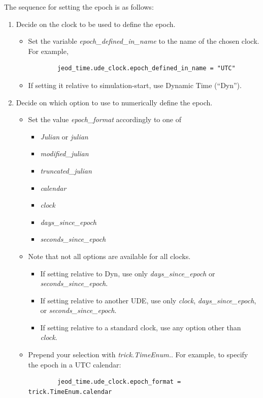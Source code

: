 The sequence for setting the epoch is as follows:
\begin{enumerate}
 \item Decide on the clock to be used to define the epoch.
 \begin{itemize}
  \item Set the variable \textit{epoch\_defined\_in\_name} to the name of the
  chosen clock.  For example,
  \begin{verbatim}
        jeod_time.ude_clock.epoch_defined_in_name = "UTC"
  \end{verbatim}
  \item If setting it relative to simulation-start, use Dynamic Time
  (``Dyn'').
 \end{itemize}

 \item Decide on which option to use to numerically define the epoch.
 \begin{itemize}
  \item Set the value \textit{epoch\_format} accordingly to one of
  \begin{itemize}
   \item \textit{Julian} or \textit{julian}
   \item \textit{modified\_julian}
   \item \textit{truncated\_julian}
   \item \textit{calendar}
   \item \textit{clock}
   \item \textit{days\_since\_epoch}
   \item \textit{seconds\_since\_epoch}
  \end{itemize}
  \item  Note that not all options are available for all clocks.
  \begin{itemize}
   \item If setting relative to Dyn, use only \textit{days\_since\_epoch}
   or \textit{seconds\_since\_epoch}.
   \item If setting relative to another UDE, use only \textit{clock},
   \textit{days\_since\_epoch},
   or \textit{seconds\_since\_epoch}.
   \item If setting relative to a standard clock, use any option other than
   \textit{clock}.
  \end{itemize}
  \item Prepend your selection with \textit{trick.TimeEnum.}.  For example,
  to specify the epoch in a UTC calendar:
  \begin{verbatim}
        jeod_time.ude_clock.epoch_format = trick.TimeEnum.calendar
  \end{verbatim}


\end{itemize}
\end{enumerate}
